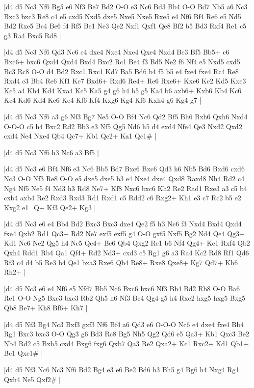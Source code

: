 \whitename{}
\blackname{}
\makegametitle
|d4 d5 Nc3 Nf6 Bg5 e6 Nf3 Be7 Bd2 O-O e3 Nc6 Bd3 Bb4 O-O Bd7 Nb5 a6 Nc3 Bxc3 bxc3 Re8 c4 e5 cxd5 Nxd5 dxe5 Nxe5 Nxe5 Rxe5 e4 Nf6 Bf4 Re6 e5 Nd5 Bd2 Rxe5 Bc4 Be6 f4 Rf5 Be1 Ne3 Qe2 Nxf1 Qxf1 Qe8 Bf2 b5 Bd3 Rxf4 Re1 c5 g3 Ra4 Bxc5 Rd8  |

\whitename{}
\blackname{}
\makegametitle
|d4 d5 Nc3 Nf6 Qd3 Nc6 e4 dxe4 Nxe4 Nxe4 Qxe4 Nxd4 Be3 Bf5 Bb5+ c6 Bxc6+ bxc6 Qxd4 Qxd4 Bxd4 Bxc2 Rc1 Be4 f3 Bd5 Ne2 f6 Nf4 e5 Nxd5 cxd5 Bc3 Rc8 O-O d4 Bd2 Rxc1 Rxc1 Kd7 Ba5 Bd6 b4 f5 b5 e4 fxe4 fxe4 Rc4 Re8 Rxd4 e3 Bb4 Re6 Kf1 Ke7 Bxd6+ Rxd6 Re4+ Re6 Rxe6+ Kxe6 Ke2 Kd5 Kxe3 Kc5 a4 Kb4 Kd4 Kxa4 Kc5 Ka5 g4 g6 h4 h5 g5 Ka4 b6 axb6+ Kxb6 Kb4 Kc6 Kc4 Kd6 Kd4 Ke6 Ke4 Kf6 Kf4 Kxg6 Kg4 Kf6 Kxh4 g6 Kg4 g7  |

\whitename{}
\blackname{}
\makegametitle
|d4 d5 Nc3 Nf6 a3 g6 Nf3 Bg7 Ne5 O-O Bf4 Nc6 Qd2 Bf5 Bh6 Bxh6 Qxh6 Nxd4 O-O-O c5 h4 Bxc2 Rd2 Bb3 e3 Nf5 Qg5 Nd6 h5 d4 exd4 Nfe4 Qe3 Nxd2 Qxd2 cxd4 Ne4 Nxe4 Qb4 Qc7+ Kb1 Qc2+ Ka1 Qc1\#  |

\whitename{}
\blackname{}
\makegametitle
|d4 d5 Nc3 Nf6 h3 Nc6 a3 Bf5  |

\whitename{}
\blackname{}
\makegametitle
|d4 d5 Nc3 e6 Bf4 Nf6 e3 Nc6 Bb5 Bd7 Bxc6 Bxc6 Qd3 h6 Nb5 Bd6 Bxd6 cxd6 Nc3 O-O Nf3 Re8 O-O e5 dxe5 dxe5 b3 e4 Nxe4 dxe4 Qxd8 Raxd8 Nh4 Rd2 c4 Ng4 Nf5 Ne5 f4 Nd3 h3 Rd8 Ne7+ Kf8 Nxc6 bxc6 Kh2 Re2 Rad1 Rxe3 a3 c5 b4 cxb4 axb4 Re2 Rxd3 Rxd3 Rd1 Rxd1 c5 Rdd2 c6 Rxg2+ Kh1 e3 c7 Rc2 b5 e2 Kxg2 e1=Q+ Kf3 Qe2+ Kg3  |

\whitename{}
\blackname{}
\makegametitle
|d4 d5 Nc3 e6 e4 Bb4 Bd2 Bxc3 Bxc3 dxe4 Qe2 f5 h3 Nc6 f3 Nxd4 Bxd4 Qxd4 fxe4 Qxb2 Rd1 Qc3+ Rd2 Ne7 exf5 exf5 g4 O-O gxf5 Nxf5 Bg2 Nd4 Qe4 Qg3+ Kd1 Ne6 Ne2 Qg5 h4 Nc5 Qc4+ Be6 Qb4 Qxg2 Re1 b6 Nf4 Qg4+ Kc1 Rxf4 Qb2 Qxh4 Rdd1 Rb4 Qa1 Qf4+ Rd2 Nd3+ cxd3 c5 Rg1 g6 a3 Ra4 Kc2 Rd8 Rf1 Qd6 Rf3 c4 d4 b5 Re3 b4 Qe1 bxa3 Rxe6 Qb4 Re8+ Rxe8 Qxe8+ Kg7 Qd7+ Kh6 Rh2+  |

\whitename{}
\blackname{}
\makegametitle
|d4 d5 Nc3 e6 e4 Nf6 e5 Nfd7 Bb5 Nc6 Bxc6 bxc6 Nf3 Bb4 Bd2 Rb8 O-O Ba6 Re1 O-O Ng5 Bxc3 bxc3 Rb2 Qh5 h6 Nf3 Bc4 Qg4 g5 h4 Rxc2 hxg5 hxg5 Bxg5 Qb8 Be7+ Kh8 Bf6+ Kh7  |

\whitename{}
\blackname{}
\makegametitle
|d4 d5 Nf3 Bg4 Nc3 Bxf3 gxf3 Nf6 Bf4 a6 Qd3 e6 O-O-O Nc6 e4 dxe4 fxe4 Bb4 Rg1 Bxc3 bxc3 O-O Qg3 g6 Bd3 Rc8 Bg5 Nh5 Qg2 Qd6 e5 Qa3+ Kb1 Qxc3 Be2 Nb4 Rd2 c5 Bxh5 cxd4 Bxg6 fxg6 Qxb7 Qa3 Re2 Qxa2+ Kc1 Rxc2+ Kd1 Qb1+ Bc1 Qxc1\#  |

\whitename{}
\blackname{}
\makegametitle
|d4 d5 Nf3 Nc6 Nc3 Nf6 Bd2 Bg4 e3 e6 Be2 Bd6 h3 Bh5 g4 Bg6 h4 Nxg4 Rg1 Qxh4 Ne5 Qxf2\#  |


